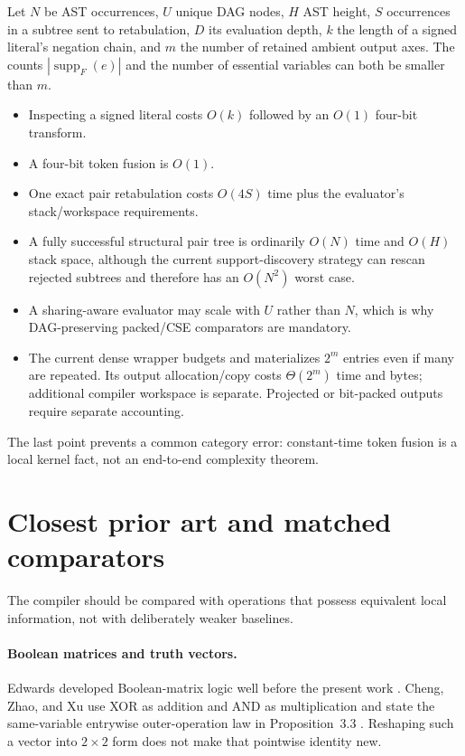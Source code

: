 \documentclass[10pt]{article}
\newcommand{\supp}{\operatorname{supp}}
\theoremstyle{plain}
\theoremstyle{definition}
\theoremstyle{remark}
\begin{document}
Let $N$ be AST occurrences, $U$ unique DAG nodes, $H$ AST height, $S$ occurrences in a subtree sent to retabulation, $D$ its evaluation depth, $k$ the length of a signed literal's negation chain, and $m$ the number of retained ambient output axes. The counts $|\supp_F(e)|$ and the number of essential variables can both be smaller than $m$.

\begin{itemize}
 \item Inspecting a signed literal costs $O(k)$ followed by an $O(1)$ four-bit transform.
 \item A four-bit token fusion is $O(1)$.
 \item One exact pair retabulation costs $O(4S)$ time plus the evaluator's stack/workspace requirements.
 \item A fully successful structural pair tree is ordinarily $O(N)$ time and $O(H)$ stack space, although the current support-discovery strategy can rescan rejected subtrees and therefore has an $O(N^2)$ worst case.
 \item A sharing-aware evaluator may scale with $U$ rather than $N$, which is why DAG-preserving packed/CSE comparators are mandatory.
 \item The current dense wrapper budgets and materializes $2^m$ entries even if many are repeated. Its output allocation/copy costs $\Theta(2^m)$ time and bytes; additional compiler workspace is separate. Projected or bit-packed outputs require separate accounting.
\end{itemize}

The last point prevents a common category error: constant-time token fusion is a local kernel fact, not an end-to-end complexity theorem.

\section{Closest prior art and matched comparators}
\label{sec:related}

The compiler should be compared with operations that possess equivalent local information, not with deliberately weaker baselines.

\paragraph{Boolean matrices and truth vectors.}
Edwards developed Boolean-matrix logic well before the present work \cite{Edwards1972}. Cheng, Zhao, and Xu use XOR as addition and AND as multiplication and state the same-variable entrywise outer-operation law in Proposition~3.3 \cite{Cheng2011}. Reshaping such a vector into $2\times2$ form does not make that pointwise identity new.
\end{document}
